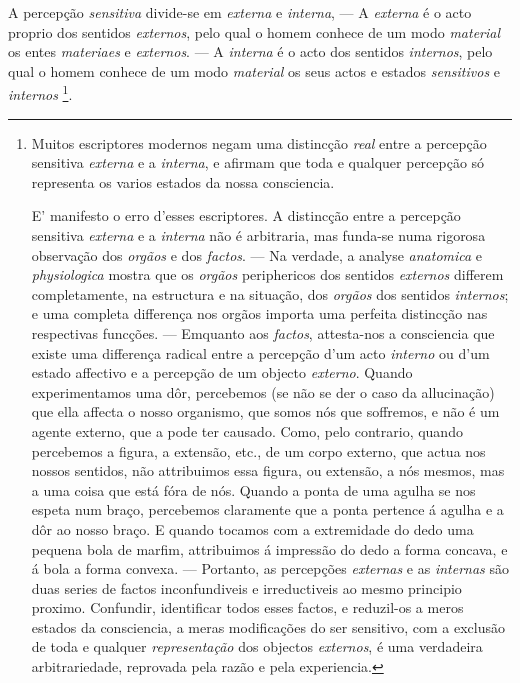 
A percepção \emph{sensitiva} divide-se em \emph{externa} e \emph{interna}, --- A \emph{externa} é o acto proprio dos sentidos \emph{externos}, pelo qual o homem conhece de um modo    \emph{material} os entes \emph{materiaes} e \emph{externos}. --- A \emph{interna} é o acto dos sentidos \emph{internos}, pelo qual o homem conhece de um modo \emph{material} os seus actos e estados \emph{sensitivos} e \emph{internos} \footnote{Muitos escriptores modernos negam uma distincção \emph{real} entre a percepção sensitiva \emph{externa} e a \emph{interna}, e afirmam que toda e qualquer percepção só representa os varios estados da nossa consciencia.\par E' manifesto o erro d'esses escriptores. A distincção entre a percepção sensitiva \emph{externa} e a \emph{interna} não é arbitraria, mas funda-se numa rigorosa observação dos \emph{orgãos} e dos \emph{factos}. --- Na verdade, a analyse \emph{anatomica} e \emph{physiologica} mostra que os \emph{orgãos} periphericos dos sentidos \emph{externos} differem completamente, na estructura e na situação, dos \emph{orgãos} dos sentidos \emph{internos}; e uma completa differença nos orgãos importa uma perfeita distincção nas respectivas funcções. --- Emquanto aos \emph{factos}, attesta-nos a consciencia que existe uma differença radical entre a percepção d'um acto \emph{interno} ou d'um estado affectivo e a percepção de um objecto \emph{externo}. Quando experimentamos uma dôr, percebemos (se não se der o caso da allucinação) que ella affecta o nosso organismo, que somos nós que soffremos, e não é um agente externo, que a pode ter causado. Como, pelo contrario, quando percebemos a figura, a extensão, etc., de um corpo externo, que actua nos nossos sentidos, não attribuimos essa figura, ou extensão, a nós mesmos, mas a uma coisa que está fóra de nós. Quando a ponta de uma agulha se nos espeta num braço, percebemos claramente que a ponta pertence á agulha e a dôr ao nosso braço. E quando tocamos com a extremidade do dedo uma pequena bola de marfim, attribuimos á impressão do dedo a forma concava, e á bola a forma convexa. --- Portanto, as percepções \emph{externas} e as \emph{internas} são duas series de factos inconfundiveis e irreductiveis ao mesmo principio proximo. Confundir, identificar todos esses factos, e reduzil-os a meros estados da consciencia, a meras modificações do ser sensitivo, com a exclusão de toda e qualquer \emph{representação} dos objectos \emph{externos}, é uma verdadeira arbitrariedade, reprovada pela razão e pela experiencia.}.

